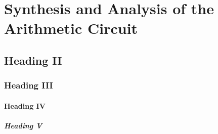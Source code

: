 \section{Synthesis and Analysis of the Arithmetic Circuit}
\subsection{Heading II}
\subsubsection{Heading III}
\paragraph{Heading IV}
\subparagraph{Heading V}
